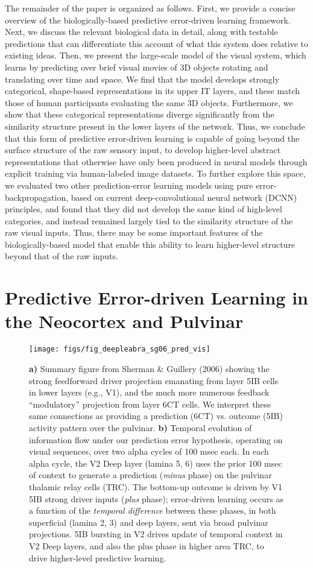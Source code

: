 \documentclass[11pt,twoside]{article}
\newif\myifpdf
\begin{document}
The remainder of the paper is organized as follows.  First, we provide a concise overview of the biologically-based predictive error-driven learning framework.  Next, we discuss the relevant biological data in detail, along with testable predictions that can differentiate this account of what this system does relative to existing ideas.  Then, we present the large-scale model of the visual system, which learns by predicting over brief visual movies of 3D objects rotating and translating over time and space.  We find that the model develops strongly categorical, shape-based representations in its upper IT layers, and these match those of human participants evaluating the same 3D objects.  Furthermore, we show that these categorical representations diverge significantly from the similarity structure present in the lower layers of the network.  Thus, we conclude that this form of predictive error-driven learning is capable of going beyond the surface structure of the raw sensory input, to develop higher-level abstract representations that otherwise have only been produced in neural models through explicit training via human-labeled image datasets.  To further explore this space, we evaluated two other prediction-error learning models using pure error-backpropagation, based on current deep-convolutional neural network (DCNN) principles, and found that they did not develop the same kind of high-level categories, and instead remained largely tied to the similarity structure of the raw visual inputs.  Thus, there may be some important features of the biologically-based model that enable this ability to learn higher-level structure beyond that of the raw inputs.


\section{Predictive Error-driven Learning in the Neocortex and Pulvinar}

\begin{figure}
  \centering\texttt{[image: figs/fig\_deepleabra\_sg06\_pred\_vis]}
  \caption{{\bf a)} Summary figure from Sherman \& Guillery (2006) showing the strong feedforward driver projection emanating from layer 5IB cells in lower layers (e.g., V1), and the much more numerous feedback ``modulatory'' projection from layer 6CT cells.  We interpret these same connections as providing a prediction (6CT) vs. outcome (5IB) activity pattern over the pulvinar.  {\bf b)} Temporal evolution of information flow under our prediction error hypothesis, operating on visual sequences, over two alpha cycles of 100 msec each.   In each alpha cycle, the V2 Deep layer (lamina 5, 6) uses the prior 100 msec of context to generate a prediction (\emph{minus} phase) on the pulvinar thalamic relay cells (TRC). The bottom-up outcome is driven by V1 5IB strong driver inputs (\emph{plus} phase); error-driven learning occurs as a function of the \emph{temporal difference} between these phases, in both superficial (lamina 2, 3) and deep layers, sent via broad pulvinar projections. 5IB bursting in V2 drives update of temporal context in V2 Deep layers, and also the plus phase in higher area TRC, to drive higher-level predictive learning.}
  \label{fig.sg06}
\end{figure}
\end{document}
